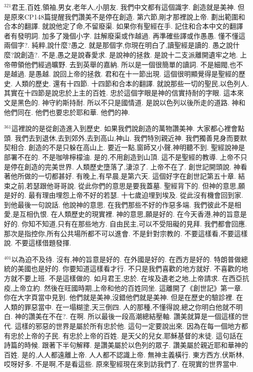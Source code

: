 \documentclass{book}
\begin{document}
$^{321}$君王,百姓,領袖,男女,老年人,小朋友.
我們中文都有這個識字.
創造就是美神.
但是原來CP148篇提醒我們讚美不是停在創造.
第六節,剛才那裡說上帝.
劃出範圍和合本的翻譯.
就說他定了命,不留廢渠.
如果你有聖經在手.
記住和合本中文的翻譯者有發明詞.
加多了幾個小字.
註解廢渠或作越過.
再準確些譯或作愚愚.
懂不懂這兩個字?.
純粹,說什麼?愚之.
就是那個字,你現在明白了,讀聖經是讀的.
愚之說什麼?說創造?.
不是,愚之是說春愛求.
是說神的拯救.
是說十二支派離開遺牢之地.
上帝帶領他們經過曠野.
去到英舉的嘉納.
所以是一個很簡單的讀詞.
不是細閥,也不是越過.
是愚越.
說回上帝的拯救.
君和在十一節出現.
這個很明顯覺得是聖經的歷史.
人類的歷史.
還有十四節.
十四節和合本的翻譯.
就說那些一切的聖民,以色列人.
其實在十四節是說忠於上主的百姓.
忠於這個字眼是神的信實持耐的字眼.
這本來文是黑色的.
神守約斯持耐.
所以不只是國情道.
是說以色列以後所走的道路.
神和他們同在.
他們也要忠於耶和華.
他們的神.

$^{361}$這裡說的是從創造進入到歷史.
如果我們說創造的萬物讚美神.
大家都心裡會點頭.
我們去到退休,去到郊外,去到高山,神山.
我們特別親近神.
我們獨善見身而要默契相合.
創造的不是只躲在高山上.
要近一點,窗師又小聲,神明聽不到.
聖經說神是部署不在的.
不是咖啡檸檬油.
是的,不用創造到山頂.
這不是聖經的教導.
上帝不只是停在創造的完美世界.
人類歷史墮落了,淒涼了.
上帝不在了.
創世記開頭說.
神看著他所做的一切都甚好.
有晚上,有早晨,是第六天.
這個好字在創世記第五十章.
結束之前,若瑟跟他哥哥說.
從此你們的意思是要我蓋墓.
聖經背下的.
但神的意思,願是好的.
最有理由埋怨上帝不好的若瑟.
十七歲迫埋到埃及.
從此沒有機會回到家.
到他最後一句說話.
他說神的意思.
在我們那些不好的作惡多端.
我們彼此不是相愛,是互相仇恨.
在人類歷史的現實裡.
神的意思,願是好的.
在今天香港,神的旨意是好的.
你知不知道,只有在那些地方.
自由民主,可以不受阻礙的見拜.
我們都會回應.
那次是指控你,所有公共場所都不可以進會.
不是針對宗教的.
不要這樣看,不要這樣說.
不要這樣借題發揮.

$^{401}$以為迫不及待.
沒有,神的旨意是好的.
在外國是好的.
在西方是好的.
特朗普做總統的美國也是好的.
你要知道這樣看才行.
不只是我們喜歡的地方就好.
不喜歡的地方就不要上班.
不是這樣做的.
如月君王,忠於.
在埃及遺老之地,上帝請求.
在西亞抗疫,上帝立約.
然後在旺國時期,上帝和他的百姓同坐.
這離開了《創世記》第一章.
你在大字頁當中見到.
他們就是美神,沒錯他們就是美神.
但是在歷史的驗診裡.
在人類的罪惡當中.
在一塌糊塗,天三倒四.
人的那種,不懂得說,總之你明白他就不明白.
神的讚美在不在?.
在啊.
所以最後一段高潮總結壓軸.
讚美就算是一個這樣的世代.
這樣的邪惡的世界是屬於所有忠於他.
這句一定要說出來.
因為在每一個地方都有忠於上帝的子民.
有忠於上帝的百姓.
是天父的兒女,耶穌基督的末徒.
這句話在詩篇的時候.
跟著下半句解釋.
是讚美屬於以色列的眾子.
讚美屬於親近耶和華神的百姓.
是的,人人都遠離上帝.
人人都不認識上帝.
無神主義橫行.
東方西方,伏斯林,哎呀好多.
不是啊,不是看這些.
原來聖經現在來到訪我們了.
在現實的世界當中.
\end{document}
